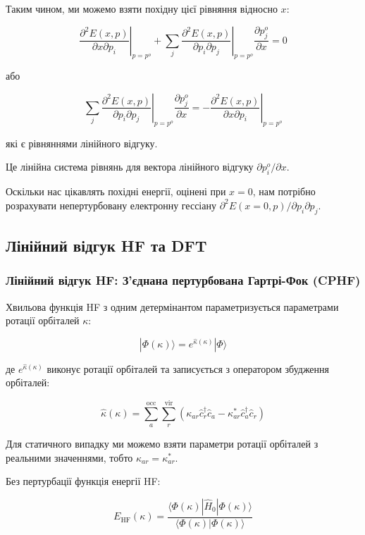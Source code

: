 \documentclass{PySCFBook}
\begin{document}
Таким чином, ми можемо взяти похідну цієї рівняння відносно \(x\):

\[\left. \frac{\partial^2 E(x, p)}{\partial x \partial p_i} \right|_{p=p^o} + \sum_j \left. \frac{\partial^2 E(x, p)}{\partial p_i \partial p_j} \right|_{p=p^o} \frac{\partial p^o_j}{\partial x} = 0\]

або

\[\sum_j \left. \frac{\partial^2 E(x, p)}{\partial p_i \partial p_j} \right|_{p=p^o} \frac{\partial p^o_j}{\partial x} = -\left. \frac{\partial^2 E(x, p)}{\partial x \partial p_i} \right|_{p=p^o}\]

які є рівняннями лінійного відгуку.

Це лінійна система рівнянь для вектора лінійного відгуку \(\partial p^o_i / \partial x\).

Оскільки нас цікавлять похідні енергії, оцінені при \(x = 0\), нам потрібно розрахувати непертурбовану електронну гессіану \(\partial^2 E(x = 0, p)/\partial p_i \partial p_j\).

\subsection{Лінійний відгук HF та DFT}

\subsubsection{Лінійний відгук HF: З'єднана пертурбована Гартрі-Фок (CPHF)}

Хвильова функція HF з одним детермінантом параметризується параметрами ротації орбіталей \(\kappa\):

\[|\Phi(\kappa)\rangle = e^{\hat{\kappa}(\kappa)} |\Phi\rangle\]

де \(e^{\hat{\kappa}(\kappa)}\) виконує ротації орбіталей та записується з оператором збудження орбіталей:

\[\hat{\kappa}(\kappa) = \sum_a^{\text{occ}} \sum_r^{\text{vir}} \left( \kappa_{ar} \hat{c}^\dagger_r \hat{c}_a - \kappa^*_{ar} \hat{c}^\dagger_a \hat{c}_r \right)\]

Для статичного випадку ми можемо взяти параметри ротації орбіталей з реальними значеннями, тобто \(\kappa_{ar} = \kappa^*_{ar}\).

Без пертурбації функція енергії HF:

\[E_{\text{HF}}(\kappa) = \frac{\langle \Phi(\kappa) | \hat{H}_0 | \Phi(\kappa) \rangle}{\langle \Phi(\kappa) | \Phi(\kappa) \rangle}\]
\end{document}
